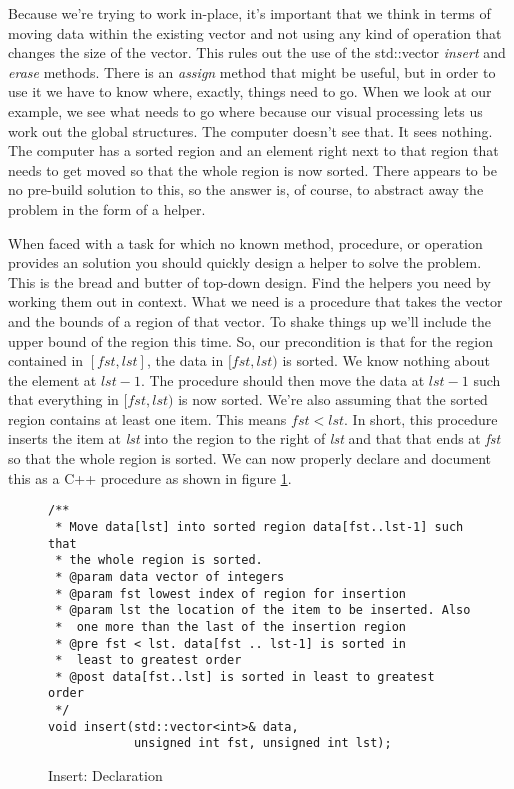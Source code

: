 \documentclass[]{tufte-handout}
\begin{document}
Because we're trying to work in-place, it's important that we think in terms of moving data within the existing vector and not using any kind of operation that changes the size of the vector. This rules out the use of the std::vector \textit{insert} and \textit{erase} methods. There is an \textit{assign} method that might be useful, but in order to use it we have to know where, exactly, things need to go.  When we look at our example, we see what needs to go where because our visual processing lets us work out the global structures. The computer doesn't see that. It sees nothing. The computer has a sorted region and an element right next to that region that needs to get moved so that the whole region is now sorted. There appears to be no pre-build solution to this, so the answer is, of course, to abstract away the problem in the form of a helper.

When faced with a task for which no known method, procedure, or operation provides an solution you should quickly design a helper to solve the problem. This is the bread and butter of top-down design. Find the helpers you need by working them out in context. What we need is a procedure that takes the vector and the bounds of a region of that vector. To shake things up we'll include the upper bound of the region this time. So, our precondition is that for the region contained in $[fst,lst]$, the data in $[fst,lst)$ is sorted. We know nothing about the element at $lst-1$. The procedure should then move the data at $lst-1$ such that everything in $[fst,lst)$ is now sorted. We're also assuming that the sorted region contains at least one item. This means $fst < lst$. In short, this procedure inserts the item at \textit{lst} into the region to the right of \textit{lst} and that that ends at \textit{fst} so that the whole region is sorted. We can now properly declare and document this as a C++ procedure as shown in figure \ref{code:insertiterdecl}.

\begin{figure}[htbp!]
\begin{lstlisting}
/**
 * Move data[lst] into sorted region data[fst..lst-1] such that
 * the whole region is sorted.
 * @param data vector of integers
 * @param fst lowest index of region for insertion
 * @param lst the location of the item to be inserted. Also
 *  one more than the last of the insertion region
 * @pre fst < lst. data[fst .. lst-1] is sorted in
 *  least to greatest order
 * @post data[fst..lst] is sorted in least to greatest order
 */
void insert(std::vector<int>& data,
   		    unsigned int fst, unsigned int lst);
\end{lstlisting}
\caption{Insert: Declaration}
\label{code:insertiterdecl}
\end{figure}
\end{document}

